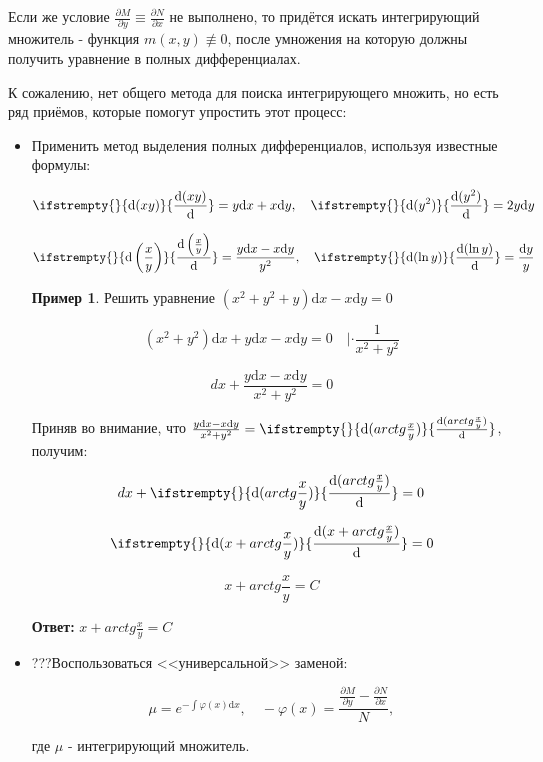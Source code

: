 \documentclass[a4paper, 14pt]{article}
\newcommand{\dx}{\mathrm{d}x}
\newcommand{\dy}{\mathrm{d}y}
\newcommand{\dv}[2]{%
  \ifstrempty{#2}%
    {\mathrm{d}#1}%
    {\frac{\mathrm{d}#1}{\mathrm{d}#2}}%
}
\newcommand{\pdv}[2]{\frac{\partial #1}{\partial #2}}
\renewcommand{\phi}{\varphi}
\theoremstyle{definition}
\newtheorem*{example}{Пример}
\newenvironment{answer}
  {\par\noindent\textbf{Ответ:}}
  {\par}
\begin{document}
Если же условие $\pdv{M}{y} \equiv \pdv{N}{x}$ не выполнено, то придётся искать интегрирующий множитель - функция $m(x, y) \not\equiv 0$, после умножения на которую должны получить уравнение в полных дифференциалах.

К сожалению, нет общего метода для поиска интегрирующего множить, но есть ряд приёмов, которые помогут упростить этот процесс:

\begin{itemize}
    \item\textbf{}Применить метод выделения полных дифференциалов, используя известные формулы:

    \[\dv{(xy)}{} = y\dx + x\dy, \quad \dv{(y^2)}{} = 2y\dy\]

    \[\dv{\left(\frac{x}{y}\right)}{} = \frac{y\dx-x\dy}{y^2}, \quad \dv{(\ln{y})}{} = \frac{\dy}{y}\]
    \begin{example}
    Решить уравнение $(x^2+y^2+y)\dx - x\dy = 0$

    \[(x^2+y^2)\dx + y\dx - x\dy = 0 \quad |\cdot \frac{1}{x^2+y^2}\]

    \[dx + \frac{y\dx - x\dy}{x^2+y^2} = 0\]

    Приняв во внимание, что $\frac{y\dx - x\dy}{x^2+y^2} = \dv{(arctg{\frac{x}{y}})}{}$, получим:

    \[dx+\dv{(arctg{\frac{x}{y}})}{} = 0\]

    \[\dv{(x+arctg{\frac{x}{y}})}{} = 0\]

    \[x+arctg{\frac{x}{y}} = C\]
    
    \end{example}
    \begin{answer}
    $x+arctg{\frac{x}{y}} = C$
    \end{answer}
    \item\textbf{}???Воспользоваться <<универсальной>> заменой:

\[\mu = e^{-\int\phi(x)\dx}, \quad -\phi(x) = \frac{\pdv{M}{y} - \pdv{N}{x}}{N},\]

где $\mu$ - интегрирующий множитель.
    
\end{itemize}
\end{document}
